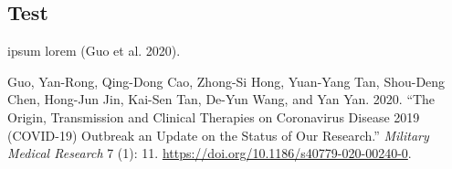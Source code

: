 \documentclass{scrartcl}
\begin{document}
\subsection{Test}\label{test}

ipsum lorem (Guo et al. 2020).

\label{refs}
\begin{CSLReferences}{1}{0}
Guo, Yan-Rong, Qing-Dong Cao, Zhong-Si Hong, Yuan-Yang Tan, Shou-Deng
Chen, Hong-Jun Jin, Kai-Sen Tan, De-Yun Wang, and Yan Yan. 2020. {``The
Origin, Transmission and Clinical Therapies on Coronavirus Disease 2019
(COVID-19) Outbreak {\textendash} an Update on the Status of Our
Research.''} \emph{Military Medical Research} 7 (1): 11.
\url{https://doi.org/10.1186/s40779-020-00240-0}.

\end{CSLReferences}
\end{document}
